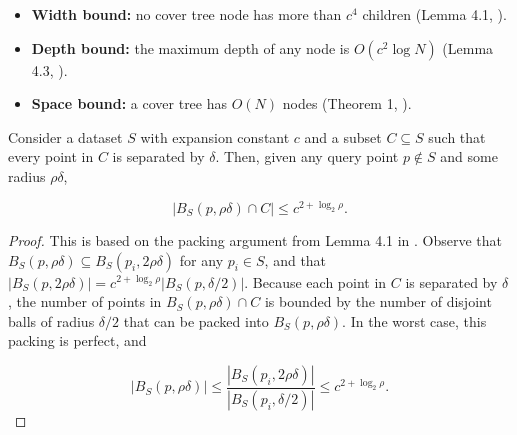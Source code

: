 \begin{itemize}
  \item {\bf Width bound:} no cover tree node has more than $c^4$ children
(Lemma 4.1, \cite{langford2006}).

  \item {\bf Depth bound:} the maximum depth of any node is $O(c^2 \log N)$
(Lemma 4.3, \cite{langford2006}).

  \item {\bf Space bound:} a cover tree has $O(N)$ nodes (Theorem 1,
\cite{langford2006}).
\end{itemize}



\begin{lemma}
Consider a dataset $S$ with expansion constant $c$ and a subset $C \subseteq S$
such that every point in $C$ is separated by $\delta$.  Then, given any query
point $p \not\in S$ and some radius $\rho \delta$,

\begin{equation}
| B_S(p, \rho \delta) \cap C | \le c^{2 + \log_2 \rho}.
\end{equation}
\label{lem:packing}
\end{lemma}

\begin{proof}
This is based on the packing argument from Lemma 4.1 in \cite{langford2006}.
Observe that $B_S(p, \rho \delta) \subseteq B_S(p_i, 2 \rho \delta)$ for any
$p_i \in S$, and that $| B_S(p, 2 \rho \delta) | = c^{2 + \log_2 \rho} |
B_S(p, \delta / 2) |$.  Because each point in $C$ is separated by $\delta$, the
number of points in $B_S(p, \rho \delta) \cap C$ is
bounded by the number of disjoint balls of radius $\delta / 2$ that can be
packed into $B_S(p, \rho \delta)$.  In the worst case, this packing is
perfect, and

\begin{equation}
|B_S(p, \rho \delta)| \le \frac{|B_S(p_i, 2 \rho \delta)|}{|B_S(p_i, \delta
/ 2)|} \le c^{2 + \log_2 \rho}.
\end{equation}\end{proof}
